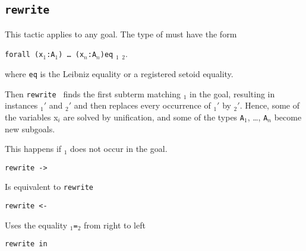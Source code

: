 \begin{coq_example*}
\subsection{\tt rewrite \term}
\label{rewrite}

This tactic applies to any goal. The type of {\term}
must have the form

\texttt{forall (x$_1$:A$_1$) \dots\ (x$_n$:A$_n$)}\texttt{eq} \term$_1$ \term$_2$.

\noindent where \texttt{eq} is the Leibniz equality or a registered
setoid equality.

\noindent Then {\tt rewrite \term} finds the first subterm matching
\term$_1$ in the goal, resulting in instances \term$_1'$ and \term$_2'$
and then replaces every occurrence of \term$_1'$ by \term$_2'$.
Hence, some of the variables x$_i$ are
solved by unification, and some of the types \texttt{A}$_1$, \dots,
\texttt{A}$_n$ become new subgoals.


\begin{ErrMsgs}
\item {}

\item {}

This happens if \term$_1$ does not occur in the goal.
\end{ErrMsgs}

\begin{Variants}
\item {\tt rewrite -> \term}

  Is equivalent to {\tt rewrite \term}

\item {\tt rewrite <- \term}

  Uses the equality \term$_1${\tt=}\term$_2$ from right to left

\item {\tt rewrite {\term} in }


\end{Variants}
\end{coq_example*}
